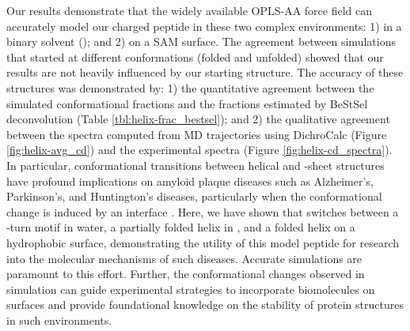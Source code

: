 Our results demonstrate that the widely available OPLS-AA force field can accurately model our charged peptide \pep{} in these two complex environments: 
1) in a binary solvent (\tbawat{}); and 
2) on a SAM surface. 
The agreement between simulations that started at different conformations (folded and unfolded) showed that our results are not heavily influenced by our starting structure. 
The accuracy of these structures was demonstrated by: 
1) the quantitative agreement between the simulated conformational fractions and the fractions estimated by BeStSel deconvolution (Table \ref{tbl:helix-frac_bestsel}); and 
2) the qualitative agreement between the spectra computed from MD trajectories using DichroCalc (Figure \ref{fig:helix-avg_cd}) and the experimental spectra (Figure \ref{fig:helix-cd_spectra}). 
In particular, conformational transitions between helical and \textbeta{}-sheet structures have profound implications on amyloid plaque diseases such as Alzheimer's, Parkinson's, and Huntington's diseases\cite{Jahn2006, Chiti2009, Abedini2009, Hoop2016, Kim2016, Mondal2019}, particularly when the conformational change is induced by an interface \cite{Chi2010, Moores2011, Ho2018}. 
Here, we have shown that \pep{} switches between a \textbeta{}-turn motif in water, a partially folded helix in \tbawat{}, and a folded helix on a hydrophobic surface, demonstrating the utility of this model peptide for research into the molecular mechanisms of such diseases. 
Accurate simulations are paramount to this effort. 
Further, the conformational changes observed in simulation can guide experimental strategies to incorporate biomolecules on surfaces and provide foundational knowledge on the stability of protein structures in such environments.

